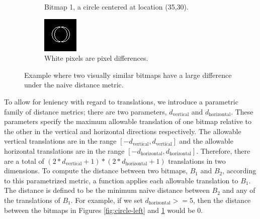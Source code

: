 \documentclass[12pt]{article}
\begin{document}
\begin{figure}
\begin{subfigure}[b]{.3\linewidth}
\caption{Bitmap 1, a circle centered at location (35,30).}
\label{fig:circle-right}
\end{subfigure}
\hspace{2mm}
\begin{subfigure}[b]{.3\linewidth}
\includegraphics[width=\linewidth]{circle-diff.png}
\caption{White pixels are pixel differences.}
\label{fig:circle-diff}
\end{subfigure}
\caption{Example where two visually similar bitmaps have a large difference under the naive distance metric.}
\label{fig:naive-distance-problem}
\end{figure}


To allow for leniency with regard to translations, we introduce a parametric family of distance metrics; there are two parameters, $d_{\text{vertical}}$ and $d_{\text{horizontal}}$.  These parameters specify the maximum allowable translation of one bitmap relative to the other in the vertical and horizontal directions respectively.  The allowable vertical translations are in the range $[-d_{\text{vertical}}, d_{\text{vertical}}]$ and the allowable horizontal translations are in the range $[-d_{\text{horizontal}}, d_{\text{horizontal}}]$.  Therefore, there are a total of $(2*d_{\text{vertical}}+1)*(2*d_{\text{horizontal}}+1)$ translations in two dimensions.  To compute the distance between two bitmaps, $B_1$ and $B_2$, according to this parametrized metric, a function applies each allowable translation to $B_1$.  The distance is defined to be the minimum naive distance between $B_2$ and any of the translations of $B_1$.  For example, if we set $d_{\text{horizontal}} >= 5$, then the distance between the bitmaps in Figures \ref{fig:circle-left} and \ref{fig:circle-right} would be 0.
\end{document}
